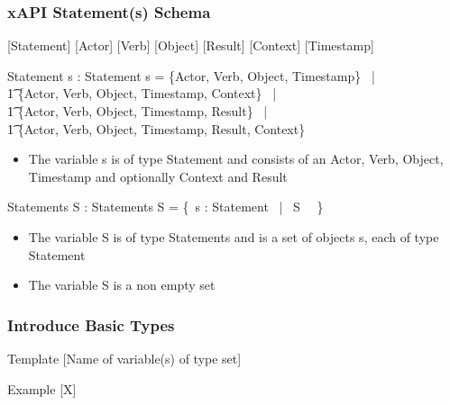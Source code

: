 \documentclass{article}
\begin{document}
\subsubsection{xAPI Statement(s) Schema}
[Statement]
[Actor]
[Verb]
[Object]
[Result]
[Context]
[Timestamp]
\begin{schema}{Statement}
    s : Statement
    \where
    s = \{Actor, Verb, Object, Timestamp\} \, |
    \\ \t1 \{Actor, Verb, Object, Timestamp, Context\} \, |
    \\ \t1 \{Actor, Verb, Object, Timestamp, Result\} \, |
    \\ \t1 \{Actor, Verb, Object, Timestamp, Result, Context\}
\end{schema}
\begin{itemize}
\item The variable s is of type Statement and consists of an Actor, Verb, Object, Timestamp and optionally Context and Result
\end{itemize}
\begin{schema}{Statements}
  S : Statements
  \where
  S = \{~s : Statement \, | \, S \, \neg \, \emptyset\} \\
\end{schema}
\begin{itemize}
\item The variable S is of type Statements and is a set of objects s, each of type Statement
\item The variable S is a non empty set
\end{itemize}
\subsubsection{Introduce Basic Types}
\begin{paragraph}{Template}
  [Name of variable(s) of type set]
\end{paragraph}
\begin{paragraph}{Example}
  [X]
\end{paragraph}
\end{document}
